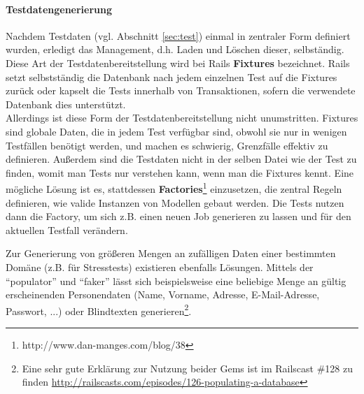 \paragraph{Testdatengenerierung}
Nachdem Testdaten (vgl. Abschnitt \ref{sec:test}) einmal in zentraler Form definiert wurden, erledigt  das Management, d.h. Laden und Löschen dieser, selbständig. Diese Art der Testdatenbereitstellung wird bei Rails \textbf{Fixtures} bezeichnet. Rails setzt selbstständig die Datenbank nach jedem einzelnen Test auf die Fixtures zurück oder kapselt die Tests innerhalb von Transaktionen, sofern die verwendete Datenbank dies unterstützt.\\
Allerdings ist diese Form der Testdatenbereitstellung nicht unumstritten. Fixtures sind globale Daten, die in jedem Test verfügbar sind, obwohl sie nur in wenigen Testfällen benötigt werden, und machen es schwierig, Grenzfälle effektiv zu definieren. Außerdem sind die Testdaten nicht in der selben Datei wie der Test zu finden, womit man Tests nur verstehen kann, wenn man die Fixtures kennt. Eine mögliche Lösung ist es, stattdessen \textbf{Factories}\footnote{http://www.dan-manges.com/blog/38} einzusetzen, die zentral Regeln definieren, wie valide Instanzen von Modellen gebaut werden. Die Tests nutzen dann die Factory, um sich z.B. einen neuen Job generieren zu lassen und für den aktuellen Testfall verändern.

Zur Generierung von größeren Mengen an zufälligen Daten einer bestimmten Domäne (z.B. für Stresstests) existieren ebenfalls Lösungen. Mittels der  "`populator"' und "`faker"' lässt sich beispielsweise eine beliebige Menge an gültig erscheinenden Personendaten (Name, Vorname, Adresse, E-Mail-Adresse, Passwort, ...) oder Blindtexten generieren\footnote{Eine sehr gute Erklärung zur Nutzung beider Gems ist im Railscast \#128 zu finden \url{http://railscasts.com/episodes/126-populating-a-database}}.


